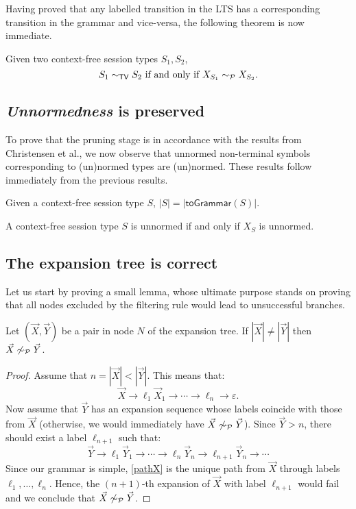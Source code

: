 Having proved that any labelled transition in the LTS has a corresponding
transition in the grammar and vice-versa, the following theorem is now 
immediate.

\begin{theorem}
\label{cfst_vs_grammar}
	Given two context-free session types $S_1, S_2$,
	\[ S_1 \sim_{\mathsf{TV}} S_2 \text{ if and only if } X_{S_1} \sim_{\mathcal{P}} X_{S_2}. \]
\end{theorem}

\subsection{\textit{Unnormedness} is preserved}

To prove that the pruning stage is in accordance with the results 
from Christensen et al., we now observe that unnormed non-terminal symbols 
corresponding to (un)normed types are (un)normed. These results follow 
immediately from the previous results. 

\begin{corollary}
	Given a context-free session type $S$, $|S| = |\mathsf{toGrammar}(S)|$.
\end{corollary}

\begin{corollary}
	A context-free session type $S$ is unnormed if and only if 
	$X_S$ is unnormed.
\end{corollary}

\subsection{The expansion tree is correct}

Let us start by proving a small lemma, whose ultimate purpose 
stands on proving that all nodes excluded by the filtering rule
would lead to unsuccessful branches.

\begin{lemma}
\label{lemma:filtering}
	Let $(\vec X, \vec Y)$ be a pair in node $N$ of the expansion tree. 
	If $|\vec X| \neq |\vec Y|$ then  $\vec X \not\sim_{\mathcal{P}} \vec Y$.
\end{lemma}

\begin{proof}
	Assume that $n = |\vec X| < |\vec Y|$. This means that:
	\begin{equation}
	\label{pathX}
		\vec X \rightarrow \ell_1 \vec X_1 \rightarrow \cdots 
		\rightarrow \ell_n \rightarrow \varepsilon.
	\end{equation}
	Now assume that $\vec Y$ has an expansion sequence whose 
	labels coincide with those from $\vec X$ (otherwise, we would immediately
	have $\vec X \not\sim_{\mathcal{P}} \vec Y$). Since $\vec Y > n$, there should 
	exist a label $\ell_{n+1}$ such that:
	\[\vec Y \rightarrow \ell_1 \vec Y_1 \rightarrow \cdots 
	\rightarrow \ell_n \vec Y_n\rightarrow \ell_{n+1} \vec Y_n 
	\rightarrow \cdots\]
	Since our grammar is simple, \eqref{pathX} is the unique path from $\vec X$
	through labels $\ell_1, \ldots, \ell_n$. Hence, the $(n+1)$-th expansion of
	$\vec X$ with label $\ell_{n+1}$ would fail and we conclude that
	$\vec X \not\sim_{\mathcal{P}} \vec Y$.
\end{proof}

